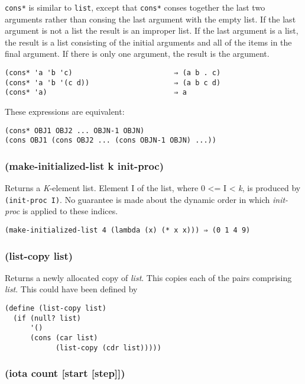 \documentclass{article}
\begin{document}
\verb|cons*| is similar to \verb|list|, except that \verb|cons*| conses together the
last two arguments rather than consing the last argument with the empty list. If
the last argument is not a list the result is an improper list. If the last
argument is a list, the result is a list consisting of the initial arguments and
all of the items in the final argument. If there is only one argument, the
result is the argument.

\begin{verbatim}
(cons* 'a 'b 'c)                        ⇒ (a b . c)
(cons* 'a 'b '(c d))                    ⇒ (a b c d)
(cons* 'a)                              ⇒ a
\end{verbatim}

These expressions are equivalent:

\begin{verbatim}
(cons* OBJ1 OBJ2 ... OBJN-1 OBJN)
(cons OBJ1 (cons OBJ2 ... (cons OBJN-1 OBJN) ...))
\end{verbatim}

\subsubsection{(make-initialized-list k init-proc)}

Returns a \emph{K}-element list. Element I of the list, where 0 \textless{}= I \textless{}
\emph{k}, is produced by \verb|(init-proc I)|. No guarantee is made about the dynamic
order in which \emph{init-proc} is applied to these indices.

\begin{verbatim}
(make-initialized-list 4 (lambda (x) (* x x))) ⇒ (0 1 4 9)
\end{verbatim}

\subsubsection{(list-copy list)}

Returns a newly allocated copy of \emph{list}. This copies each of the pairs comprising
\emph{list}. This could have been defined by

\begin{verbatim}
(define (list-copy list)
  (if (null? list)
      '()
      (cons (car list)
            (list-copy (cdr list)))))
\end{verbatim}

\subsubsection{(iota count [start [step]])}
\end{document}
